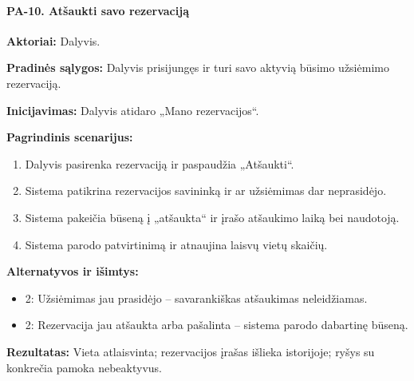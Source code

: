 \paragraph{PA-10. Atšaukti savo rezervaciją}\mbox{}\par
\textbf{Aktoriai:} Dalyvis.\par
\textbf{Pradinės sąlygos:} Dalyvis prisijungęs ir turi savo aktyvią būsimo užsiėmimo rezervaciją.\par
\textbf{Inicijavimas:} Dalyvis atidaro „Mano rezervacijos“.\par
\textbf{Pagrindinis scenarijus:}
\begin{enumerate}
\item Dalyvis pasirenka rezervaciją ir paspaudžia „Atšaukti“.
\item Sistema patikrina rezervacijos savininką ir ar užsiėmimas dar neprasidėjo.
\item Sistema pakeičia būseną į „atšaukta“ ir įrašo atšaukimo laiką bei naudotoją.
\item Sistema parodo patvirtinimą ir atnaujina laisvų vietų skaičių.
\end{enumerate}
\textbf{Alternatyvos ir išimtys:}
\begin{itemize}
\item 2: Užsiėmimas jau prasidėjo -- savarankiškas atšaukimas neleidžiamas.
\item 2: Rezervacija jau atšaukta arba pašalinta -- sistema parodo dabartinę būseną.
\end{itemize}
\textbf{Rezultatas:} Vieta atlaisvinta; rezervacijos įrašas išlieka istorijoje; ryšys su konkrečia pamoka nebeaktyvus.\par
{}
